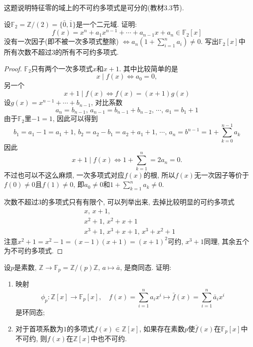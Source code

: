 \begin{remark}
    这题说明特征零的域上的不可约多项式是可分的(教材3.3节).
\end{remark}

\begin{problem}
    设$\mathbb{F}_2 = \mathbb{Z}/(2) = \{\bar{0}, \bar{1}\}$是一个二元域. 证明:
    \[
        f(x) = x^n + a_1x^{n - 1} + \cdots + a_{n - 1}x + a_n \in \mathbb{F}_2[x]
    \]
    没有一次因子(即不被一次多项式整除)
    \(
        \Leftrightarrow a_n\left(1 + \sum_{i = 1}^n a_i\right) \neq 0.
    \)
    写出$\mathbb{F}_2[x]$中所有次数不超过$3$的所有不可约多项式.
\end{problem}

\begin{proof}
    $\mathbb{F}_2$只有两个一次多项式$x$和$x + 1$. 其中比较简单的是
    \[
        x \mid f(x) \iff a_0 = 0,
    \]
    另一个
    \[
        x + 1 \mid f(x) \iff f(x) = (x + 1)g(x)
    \]
    设$g(x) = x^{n - 1} + \cdots + b_{n - 1}$, 对比系数
    \[
        a_n = b_{n - 1},\, a_{n - 1} = b_{n - 1} + b_{n - 2},\, \cdots,\, a_{1} = b_1 + 1
    \]
    由于$\mathbb{F}_2$里$-1 = 1$, 因此可以得到
    \[
        b_1 = a_1 - 1 = a_1 + 1,\, b_2 = a_2 - b_1 = a_2 + a_1 + 1,\, \cdots,\, a_n = b^{n - 1} = 1 + \sum_{k = 0}^{n - 1} a_k
    \]
    因此
    \[
        x + 1 \mid f(x) \iff 1 + \sum_{k = 1}^{n} = 2a_n = 0.
    \]
    不过也可以不这么麻烦, 一次多项式对应$f(x)$的根, 所以$f(x)$无一次因子等价于$f(0) \neq 0$且$f(1) \neq 0$, 即$a_0 \neq 0$和$1 + \sum_{k = 1}^{n} a_k \neq 0$.

    次数不超过$3$的多项式只有有限个, 可以列举出来, 去掉比较明显的可约多项式
    \[
    \begin{aligned}
        &x,\, x + 1,\\
        &x^2 + 1,\, x^2 + x + 1\\
        &x^3 + 1,\, x^3 + x + 1,\, x^3 + x^2 + 1
    \end{aligned}
    \]
    注意$x^2 + 1 = x^2 - 1 = (x - 1)(x + 1) = (x + 1)^2$可约, $x^3 + 1$同理, 其余五个为不可约多项式.
\end{proof}

\begin{problem}
    设$p$是素数, $\mathbb{Z} \to \mathbb{F}_p = \mathbb{Z}/(p)\mathbb{Z},\, a \mapsto \bar{a}$, 是商同态. 证明:
    \begin{enumerate}[(1)]
        \item 映射
        \[
            \phi_p:\mathbb{Z}[x] \to \mathbb{F}_p[x],\quad f(x) = \sum_{i = 1}^n a_ix^i \mapsto \bar{f}(x) = \sum_{i = 1}^n \bar{a}_ix^i
        \]
        是环同态;
        \item 对于首项系数为$1$的多项式$f(x) \in \mathbb{Z}[x]$, 如果存在素数$p$使$\bar{f}(x)$在$\mathbb{F}_p[x]$中不可约, 则$f(x)$在$\mathbb{Z}[x]$中也不可约.
    \end{enumerate}
\end{problem}

